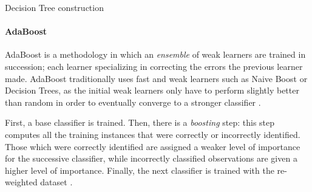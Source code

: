 \begin{algorithm}[ht]




\caption{Decision Tree construction \cite{liu2007web}}
\end{algorithm}

\paragraph{AdaBoost} \label{sec:adaboost}

AdaBoost is a methodology in which an \textit{ensemble} of weak learners are trained in succession; each learner specializing in correcting the errors the previous learner made. AdaBoost traditionally uses fast and weak learners such as Naive Boost or Decision Trees, as the initial weak learners only have to perform slightly better than random in order to eventually converge to a stronger classifier \cite{liu2007web}.

First, a base classifier is trained. Then, there is a \textit{boosting} step: this step computes all the training instances that were correctly or incorrectly identified. Those which were correctly identified are assigned a weaker level of importance for the successive classifier, while incorrectly classified observations are given a higher level of importance. Finally, the next classifier is trained with the re-weighted dataset \cite{adaboost}. 


